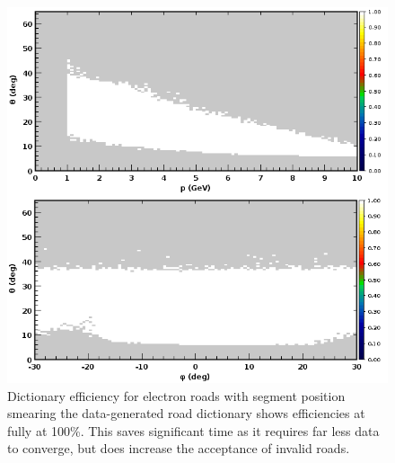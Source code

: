 \begin{figure}[hbt]
	\centering
	\includegraphics[width=1.0\columnwidth,keepaspectratio]{img/dc_neg_data_efficiency_smearing.png}
	\caption{Dictionary efficiency for electron roads with segment position smearing the data-generated road dictionary shows efficiencies at fully at 100\%. This saves significant time as it requires far less data to converge, but does increase the acceptance of invalid roads.}
	\label{fig:dc_neg_data_efficiency_smearing}
\end{figure}

